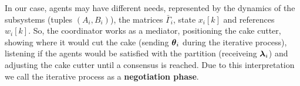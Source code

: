 \documentclass[../main.tex]{subfiles}
\begin{document}
In our case, agents may have different needs, represented by the dynamics of the subsystems (tuples $(A_{i},B_{i})$), the matrices $\bar{\Gamma}_{i}$, state $x_{i}[k]$ and references $w_{i}[k]$.
So, the coordinator works as a mediator, positioning the cake cutter, showing where it would cut the cake (sending $\boldsymbol{\theta}_i$ during the iterative process), listening if the agents would be satisfied with the partition (receiveing $\boldsymbol{\lambda}_i$) and adjusting the cake cutter until a consensus is reached.
Due to this interpretation we call the iterative process as a \textbf{negotiation phase}.


\end{document}
